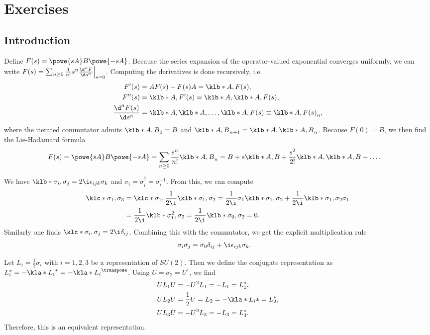 \documentclass[english, parskip=full]{scrbook}
\newcommand{\example}[3]{\begin{tcolorbox}[colback=colorbackgroundexample,colframe=colorexample, breakable,enhanced,title={\textbf{#1}: #2.}]#3\end{tcolorbox}}
\begin{document}
\chapter{Exercises}
\section{Introduction}
\example{Lie-Hadamard Formula}{$\powe{A}B\powe{-A}$}{
Define $F(s)=\powe{sA}B\powe{-sA}$.
Because the series expansion of the operator-valued exponential converges uniformly, we can write $F(s)=\sum_{n\ge 0} \frac{1}{n!}s^n\frac{\d^n F}{\d s^n} \Big\vert_{s=0}$.
Computing the derivatives is done recursively, i.e.
\begin{align}
F'(s) &= AF(s) - F(s)A = \klb*{A,F(s)},\\
F''(s) &= \klb*{A,F'(s)} = \klb*{A,\klb*{A,F(s)}},\\
\frac{\d^n F(s)}{\d s^n} &= \klb*{A,\klb*{A,\dots,\klb*{A,F(s)}}} \equiv \klb*{A,F(s)}_n,
\end{align}
where the iterated commutator admits $\klb*{A,B}_0=B$ and $\klb*{A,B}_{n+1}=\klb*{A,\klb*{A,B}_n}$.
Because $F(0)=B$, we then find the Lie-Hadamard formula
\begin{align}
F(s) &= \powe{sA}B\powe{-sA} = \sum_{n\ge 0} \frac{s^n}{n!} \klb*{A,B}_n = B + s\klb*{A,B} + \frac{s^2}{2!} \klb*{A,\klb*{A,B}} + \dots.
\end{align}
}
\example{Pauli Spin Matrices}{}{
We have $\klb*{\sigma_i,\sigma_j} = 2\i\epsilon_{ijk} \sigma_k$ and $\sigma_i=\sigma_i^\dagger = \sigma_i^{-1}$.
From this, we can compute
\begin{align}
\klc*{\sigma_1,\sigma_3} &= \klc*{\sigma_1, \frac{1}{2\i} \klb*{\sigma_1,\sigma_2}} = \frac{1}{2\i}\sigma_1\klb*{\sigma_1,\sigma_2} + \frac{1}{2\i} \klb*{\sigma_1,\sigma_2}\sigma_1\\
&= \frac{1}{2\i} \klb*{\sigma_1^2,\sigma_2} = \frac{1}{2\i}\klb*{\sigma_0,\sigma_2} = 0.
\end{align}
Similarly one finds $\klc*{\sigma_i,\sigma_j}=2\i\delta_{ij}$.
Combining this with the commutator, we get the explicit multiplication rule
\begin{align}
\sigma_i\sigma_j &= \sigma_0 \delta_{ij} + \i \epsilon_{ijk} \sigma_k.
\end{align}
}
\example{Equivalent Representation}{$SU(2)$}{
Let $L_i=\frac{1}{2}\sigma_i$ with $i=1,2,3$ be a representation of $SU(2)$.
Then we define the conjugate representation as $L_i^\ast = -\kla*{L_i}^\ast = -\kla*{L_i}^\transpose$.
Using $U=\sigma_2=U^\dagger$, we find
\begin{align}
UL_1U &= -U^2L_1=-L_1=L_1^\ast,\\
UL_2U &= \frac{1}{2}U = L_2=-\kla*{L_i}\ast = L_2^\ast,\\
UL_3U &= -U^2L_3=-L_3=L_3^\ast.
\end{align}
Therefore, this is an equivalent representation.
}
\end{document}
